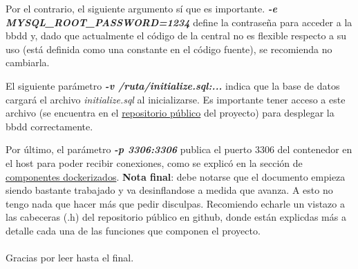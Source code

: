 \documentclass[a4paper,12pt]{article}
\begin{document}
Por el contrario, el siguiente argumento sí que es importante. \textbf{\textit{-e MYSQL\_ROOT\_PASSWORD=1234}}
define la contraseña para acceder a la bbdd y, dado que actualmente el código de la central no es flexible respecto a su uso (está definida
como una constante en el código fuente), se recomienda no cambiarla. \par

El siguiente parámetro \textbf{\textit{-v /ruta/initialize.sql:...}} indica que la base de datos cargará el archivo \textit{initialize.sql}
al inicializarse. Es importante tener acceso a este archivo (se encuentra en el
\href{https://github.com/abtb2-ua/easycab/blob/main/src/initialize.sql}{repositorio público} del proyecto) para desplegar la bbdd correctamente. \par

Por último, el parámetro \textbf{\textit{-p 3306:3306}} publica el puerto 3306 del contenedor en el host para poder recibir conexiones, como
se explicó en la sección de \hyperref[sec:componentes_docker]{componentes dockerizados}.
\clearpage
\textbf{Nota final}: debe notarse que el documento empieza siendo bastante trabajado y va desinflandose a medida que avanza.
A esto no tengo nada que hacer más que pedir disculpas. Recomiendo echarle un vistazo a las cabeceras (.h) del repositorio público
en github, donde están explicdas más a detalle cada una de las funciones que componen el proyecto.
\\
\\
Gracias por leer hasta el final.
\end{document}
